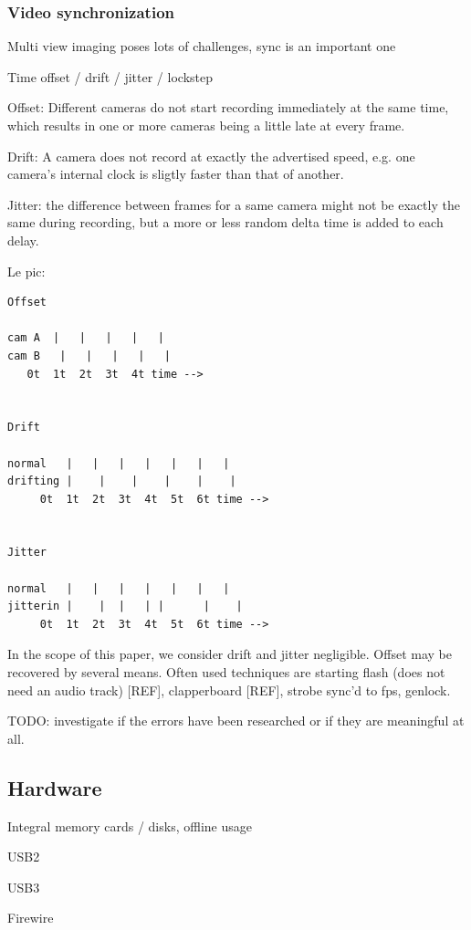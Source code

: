 \subsubsection{Video synchronization}

Multi view imaging poses lots of challenges, sync is an important one

Time offset / drift / jitter / lockstep

Offset: Different cameras do not start recording immediately at the same time, which results in one or more cameras being a little late at every frame.

Drift: A camera does not record at exactly the advertised speed, e.g. one camera's internal clock is sligtly faster than that of another.

Jitter: the difference between frames for a same camera might not be exactly the same during recording, but a more or less random delta time is added to each delay.

Le pic:

\begin{verbatim}
Offset

cam A  |   |   |   |   |
cam B   |   |   |   |   |
   0t  1t  2t  3t  4t time -->


Drift

normal   |   |   |   |   |   |   |
drifting |    |    |    |    |    |
	 0t  1t  2t  3t  4t  5t  6t time -->


Jitter

normal   |   |   |   |   |   |   |
jitterin |    |  |   | |      |    |
	 0t  1t  2t  3t  4t  5t  6t time -->
\end{verbatim}

In the scope of this paper, we consider drift and jitter negligible.
Offset may be recovered by several means.
Often used techniques are starting flash (does not need an audio track) [REF], clapperboard [REF], strobe sync'd to fps, genlock.

TODO: investigate if the errors have been researched or if they are meaningful at all.


\subsection{Hardware}

Integral memory cards / disks, offline usage

USB2

USB3

Firewire

